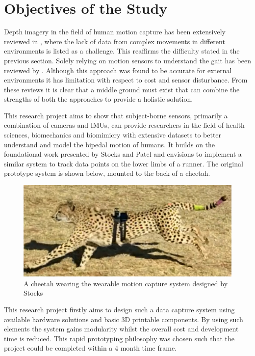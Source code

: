   
\section{Objectives of the Study}
Depth imagery in the field of human motion capture has been extensively reviewed in \cite{chen2013survey}, where the lack of data from complex movements in different environments is listed as a challenge. This reaffirms the difficulty stated in the previous section. Solely relying on motion sensors to understand the gait has been reviewed by \cite{picerno201725}. Although this approach was found to be accurate for external environments it has limitation with respect to cost and sensor disturbance. From these reviews it is clear that a middle ground must exist that can combine the strengths of both the approaches to provide a holistic solution.

This research project aims to show that subject-borne sensors, primarily a combination of cameras and IMUs, can provide researchers in the field of health sciences, biomechanics and biomimicry with extensive datasets to better understand and model the bipedal motion of humans. It builds on the foundational work presented by Stocks and Patel \cite{bradstocks} and envisions to implement a similar system to track data points on the lower limbs of a runner. The original prototype system is shown below, mounted to the back of a cheetah.

\begin{figure}[!ht] 
\captionsetup{width=0.8\linewidth, font=small}  
\includegraphics[width=0.9\linewidth]{figures/introcheetah.png}
\caption{A cheetah wearing the wearable motion capture system designed by Stocks \cite{bradstocks}}
\label{fig:introcheetah}
\end{figure}

This research project firstly aims to design such a data capture system using available hardware solutions and basic 3D printable components. By using such elements the system gains modularity whilst the overall cost and development time is reduced. This rapid prototyping philosophy was chosen such that the project could be completed within a 4 month time frame.

